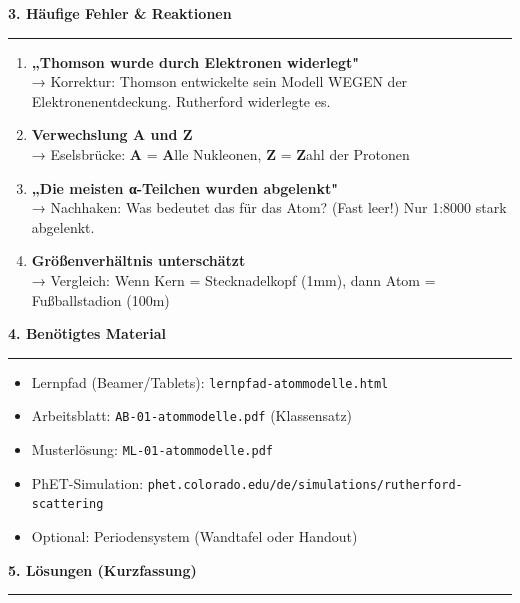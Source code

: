 \documentclass[11pt, a4paper]{article}
\newcommand{\abschnitt}[1]{%
    \vspace{10pt}\noindent\textbf{\textcolor{physik}{\large #1}}\vspace{6pt}\hrule\vspace{8pt}
}
\begin{document}
\vspace{12pt}

\abschnitt{3. Häufige Fehler \& Reaktionen}

\begin{warnbox}
\begin{enumerate}
\item \textbf{„Thomson wurde durch Elektronen widerlegt"}\\
→ Korrektur: Thomson entwickelte sein Modell WEGEN der Elektronenentdeckung. Rutherford widerlegte es.

\item \textbf{Verwechslung A und Z}\\
→ Eselsbrücke: \textbf{A} = \textbf{A}lle Nukleonen, \textbf{Z} = \textbf{Z}ahl der Protonen

\item \textbf{„Die meisten α-Teilchen wurden abgelenkt"}\\
→ Nachhaken: Was bedeutet das für das Atom? (Fast leer!) Nur 1:8000 stark abgelenkt.

\item \textbf{Größenverhältnis unterschätzt}\\
→ Vergleich: Wenn Kern = Stecknadelkopf (1mm), dann Atom = Fußballstadion (100m)
\end{enumerate}
\end{warnbox}

\vspace{12pt}

\abschnitt{4. Benötigtes Material}

\begin{itemize}
\item Lernpfad (Beamer/Tablets): \texttt{lernpfad-atommodelle.html}
\item Arbeitsblatt: \texttt{AB-01-atommodelle.pdf} (Klassensatz)
\item Musterlösung: \texttt{ML-01-atommodelle.pdf}
\item PhET-Simulation: \texttt{phet.colorado.edu/de/simulations/rutherford-scattering}
\item Optional: Periodensystem (Wandtafel oder Handout)
\end{itemize}

\vspace{12pt}

\abschnitt{5. Lösungen (Kurzfassung)}
\end{document}
